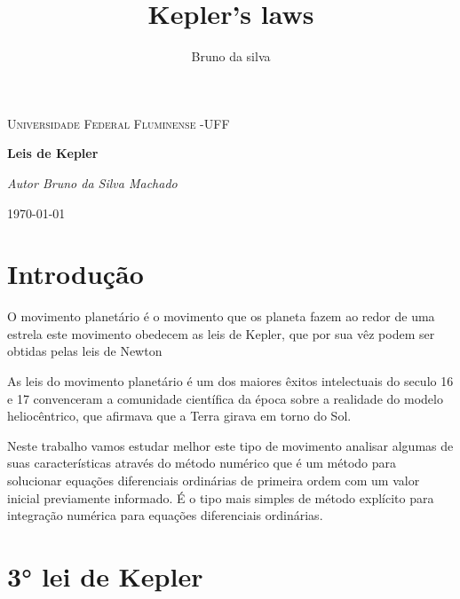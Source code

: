 \documentclass[a4paper]{article} %
\begin{document}

\title{Kepler's laws}
\author{Bruno da silva}

\selectfont
\begin{titlepage}
	\begin{center}
		{\scshape\Large Universidade Federal Fluminense -UFF \par}
		\vspace{7cm}
		{\huge\bfseries Leis de Kepler \par}
		\vspace{5.5cm}
		{\itshape Autor Bruno da Silva Machado \par}      
			
		\vspace{6.5cm}    
			
		\vfill
		{\large \today\par}
	\end{center}
\end{titlepage}

\setcounter{secnumdepth}{0}
\section{Introdu\c{c}\~{a}o}
\noindent

O movimento planet\'{a}rio \'{e} o movimento que os planeta fazem ao redor de uma estrela este movimento obedecem as leis de Kepler, que por sua v\^{e}z podem ser obtidas pelas leis de Newton

As leis do movimento planet\'{a}rio \'e um dos maiores \^{e}xitos intelectuais do seculo 16 e 17 convenceram a comunidade científica da \'{e}poca sobre a realidade do modelo heliocêntrico, que afirmava que a Terra girava em torno do Sol.

Neste trabalho vamos estudar melhor este tipo de movimento analisar algumas de suas caracter\'{i}sticas atrav\'{e}s do m\'{e}todo num\'{e}rico que \'{e} um m\'{e}todo para solucionar equa\c{c}\~{o}es diferenciais ordin\'{a}rias de primeira ordem com um valor inicial previamente informado. \'{E} o tipo mais simples de m\'{e}todo expl\'{i}cito para integra\c{c}\~{a}o num\'{e}rica para equa\c{c}\~{o}es diferenciais ordin\'{a}rias.
\noindent \eject 

\section{3° lei de Kepler}
\noindent 
\end{document}
